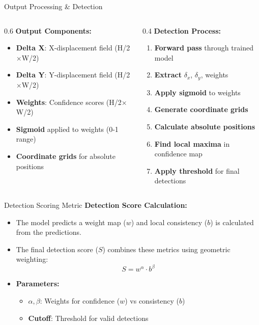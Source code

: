 \begin{frame}{Output Processing \& Detection}
\begin{columns}
\begin{column}{0.6\textwidth}
\textbf{Output Components:}
\begin{itemize}
    \item \textbf{Delta X}: X-displacement field (H/2$\times$W/2)
    \item \textbf{Delta Y}: Y-displacement field (H/2$\times$W/2)  
    \item \textbf{Weights}: Confidence scores (H/2$\times$W/2)
    \item \textbf{Sigmoid} applied to weights (0-1 range)
    \item \textbf{Coordinate grids} for absolute positions
\end{itemize}
\end{column}
\begin{column}{0.4\textwidth}
\textbf{Detection Process:}
\begin{enumerate}
    \item \textbf{Forward pass} through trained model
    \item \textbf{Extract} $\delta_x$, $\delta_y$, weights
    \item \textbf{Apply sigmoid} to weights
    \item \textbf{Generate coordinate grids}
    \item \textbf{Calculate absolute positions}
    \item \textbf{Find local maxima} in confidence map
    \item \textbf{Apply threshold} for final detections
\end{enumerate}
\end{column}
\end{columns}
\end{frame}

\begin{frame}{Detection Scoring Metric}
    \textbf{Detection Score Calculation:}
    \begin{itemize}
        \item The model predicts a weight map ($w$) and local consistency ($b$) is calculated from the predictions.
        \item The final detection score ($S$) combines these metrics using geometric weighting:
        \begin{equation*}
            S = w^\alpha \cdot b^\beta
        \end{equation*}
        \item \textbf{Parameters:}
        \begin{itemize}
            \item $\alpha, \beta$: Weights for confidence ($w$) vs consistency ($b$)
            \item \textbf{Cutoff}: Threshold for valid detections
        \end{itemize}
    \end{itemize}
\end{frame}

